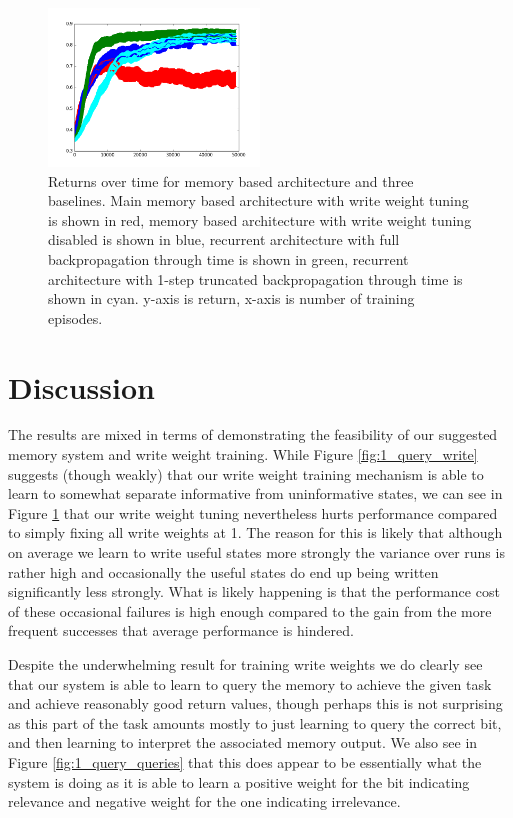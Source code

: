 \documentclass{article}
\begin{document}
\begin{figure}[!ht]
\center
\includegraphics[width=0.5\textwidth]{images/combined_ret.png}
\caption{Returns over time for memory based architecture and three baselines. Main memory based architecture with write weight tuning is shown in red, memory based architecture with write weight tuning disabled is shown in blue, recurrent architecture with full backpropagation through time is shown in green, recurrent architecture with 1-step truncated backpropagation through time is shown in cyan. y-axis is return, x-axis is number of training episodes.}
\label{fig:comparison}
\end{figure}

\section*{Discussion}
The results are mixed in terms of demonstrating the feasibility of our suggested memory system and write weight training. While Figure \ref{fig:1_query_write} suggests (though weakly) that our write weight training mechanism is able to learn to somewhat separate informative from uninformative states, we can see in Figure \ref{fig:comparison} that our write weight tuning nevertheless hurts performance compared to simply fixing all write weights at 1. The reason for this is likely that although on average we learn to write useful states more strongly the variance over runs is rather high and occasionally the useful states do end up being written significantly less strongly. What is likely happening is that the performance cost of these occasional failures is high enough compared to the gain from the more frequent successes that average performance is hindered.

Despite the underwhelming result for training write weights we do clearly see that our system is able to learn to query the memory to achieve the given task and achieve reasonably good return values, though perhaps this is not surprising as this part of the task amounts mostly to just learning to query the correct bit, and then learning to interpret the associated memory output. We also see in Figure \ref{fig:1_query_queries} that this does appear to be essentially what the system is doing as it is able to learn a positive weight for the bit indicating relevance and negative weight for the one indicating irrelevance.
\end{document}
